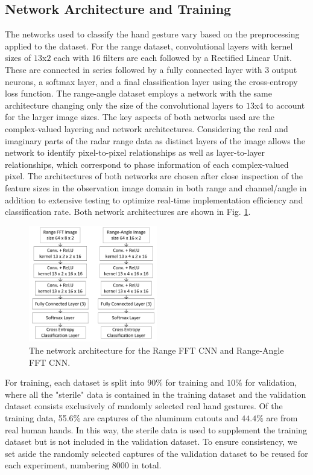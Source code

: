 \documentclass{ieeeaccess}
\begin{document}
\subsection{Network Architecture and Training}
\label{subsec:network_architecture}
The networks used to classify the hand gesture vary based on the preprocessing applied to the dataset. For the range dataset, convolutional layers with kernel sizes of $13$x$2$ each with $16$ filters are each followed by a Rectified Linear Unit. These are connected in series followed by a fully connected layer with $3$ output neurons, a softmax layer, and a final classification layer using the cross-entropy loss function. The range-angle dataset employs a network with the same architecture changing only the size of the convolutional layers to $13$x$4$ to account for the larger image sizes. The key aspects of both networks used are the complex-valued layering and network architectures. Considering the real and imaginary parts of the radar range data as distinct layers of the image allows the network to identify pixel-to-pixel relationships as well as layer-to-layer relationships, which correspond to phase information of each complex-valued pixel. The architectures of both networks are chosen after close inspection of the feature sizes in the observation image domain in both range and channel/angle in addition to extensive testing to optimize real-time implementation efficiency and classification rate. Both network architectures are shown in Fig. \ref{fig:cnn_architectures}. 

\begin{figure}[h]
    \centering
    \includegraphics[width=0.5\textwidth]{cnn_architectures.png}
    \caption{The network architecture for the Range FFT CNN and Range-Angle FFT CNN.}
    \label{fig:cnn_architectures}
\end{figure}

For training, each dataset is split into $90\%$ for training and $10\%$ for validation, where all the "sterile" data is contained in the training dataset and the validation dataset consists exclusively of randomly selected real hand gestures. Of the training data, 55.6\% are captures of the aluminum cutouts and $44.4\%$ are from real human hands. In this way, the sterile data is used to supplement the training dataset but is not included in the validation dataset. To ensure consistency, we set aside the randomly selected captures of the validation dataset to be reused for each experiment, numbering $8000$ in total.
\end{document}
